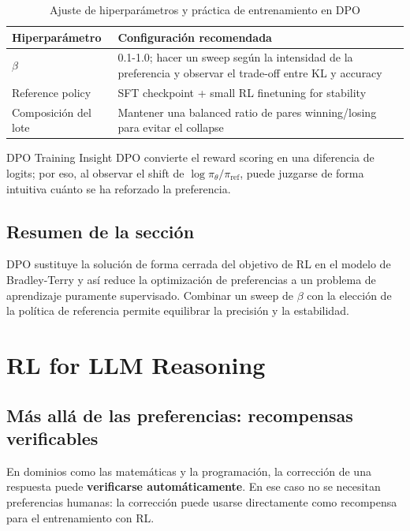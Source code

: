 \documentclass[a4paper]{article}
\begin{document}
\begin{table}[H]
\centering
\begin{tabular}{p{} p{}}
\toprule
Hiperparámetro & Configuración recomendada \\
\midrule
$\beta$ & 0.1-1.0; hacer un sweep según la intensidad de la preferencia y observar el trade-off entre KL y accuracy \\
Reference policy & SFT checkpoint + small RL finetuning for stability \\
Composición del lote & Mantener una balanced ratio de pares winning/losing para evitar el collapse \\
\bottomrule
\end{tabular}
\caption{Ajuste de hiperparámetros y práctica de entrenamiento en DPO}
\end{table}

\begin{knowledgebox}{DPO Training Insight}
DPO convierte el reward scoring en una diferencia de logits; por eso, al observar el shift de $\log \pi_\theta / \pi_{\mathrm{ref}}$, puede juzgarse de forma intuitiva cuánto se ha reforzado la preferencia.
\end{knowledgebox}

\subsection{Resumen de la sección}

DPO sustituye la solución de forma cerrada del objetivo de RL en el modelo de Bradley-Terry y así reduce la optimización de preferencias a un problema de aprendizaje puramente supervisado. Combinar un sweep de $\beta$ con la elección de la política de referencia permite equilibrar la precisión y la estabilidad.
\section{RL for LLM Reasoning}

\subsection{Más allá de las preferencias: recompensas verificables}

En dominios como las matemáticas y la programación, la corrección de una respuesta puede \textbf{verificarse automáticamente}. En ese caso no se necesitan preferencias humanas: la corrección puede usarse directamente como recompensa para el entrenamiento con RL.
\end{document}
